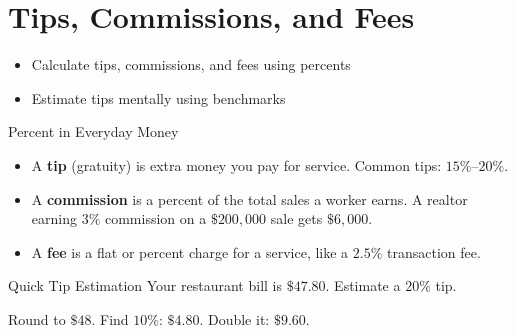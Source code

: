 \section{Tips, Commissions, and Fees}

\begin{learningGoals}
\begin{itemize}
    \item Calculate tips, commissions, and fees using percents
    \item Estimate tips mentally using benchmarks
\end{itemize}
\end{learningGoals}

\begin{conceptBox}{Percent in Everyday Money}
\begin{itemize}[leftmargin=*]
    \item A \textbf{tip} (gratuity) is extra money you pay for service. Common tips: $15\%$--$20\%$.
    \item A \textbf{commission} is a percent of the total sales a worker earns. A realtor earning $3\%$ commission on a $\$200{,}000$ sale gets $\$6{,}000$.
    \item A \textbf{fee} is a flat or percent charge for a service, like a $2.5\%$ transaction fee.
\end{itemize}
\end{conceptBox}

\begin{workedExample}{Quick Tip Estimation}
Your restaurant bill is $\$47.80$. Estimate a $20\%$ tip.

Round to $\$48$. Find $10\%$: $\$4.80$. Double it: $\$9.60$.
\end{workedExample}


